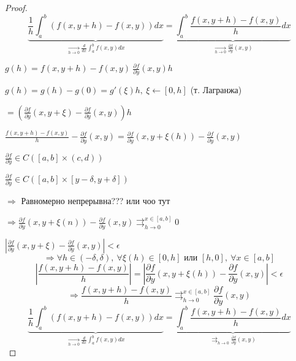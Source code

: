     \begin{proof}
        \[
            \underbrace{\frac{1}{h} \int_a^b (f(x, y+h) - f(x, y)) dx}_{\xrightarrow[h \rightarrow 0]{} \frac{d}{dx}\int_a^b f(x, y) dx} = \underbrace{\int_a^b \frac{f(x, y + h) - f(x, y)}{h} dx}_{\xrightarrow[h \rightarrow 0]{} \frac{\partial f}{\partial y}(x, y)}   
        \] %
        \par $g(h) = f(x, y+h) - f(x, y) \ \frac{\partial f}{\partial y}(x, y) h$
        \par $g(h) = g(h) - g(0) = g'(\xi) h, \ \xi \leftarrow [0, h]$ \quad (т. Лагранжа)
        \par $= (\frac{\partial f}{\partial y}(x, y + \xi) - \frac{\partial f}{\partial y}(x, y))h$
        \par $\frac{f(x, y+h) - f(x, y)}{h} - \frac{\partial f}{\partial y}(x, y) = \frac{\partial f}{\partial y}(x, y + \xi(h)) - \frac{\partial f}{\partial y}(x, y)$
        \par $\frac{\partial f}{\partial y} \in C([a, b] \times (c, d))$
        \par $\frac{\partial f}{\partial y} \in C([a, b] \times [y - \delta, y + \delta])$
        \par $\Rightarrow$ Равномерно непрерывна??? или чоо тут
        \par $\Rightarrow \frac{\partial f}{\partial y} (x, y + \xi(n)) - \frac{\partial f}{\partial y}(x, y) \rightrightarrows_{h \rightarrow 0}^{x \in [a, b] } 0$ %
        \par $|\frac{\partial f}{\partial y}(x, y + \xi) - \frac{\partial f}{\partial y}(x, y)| < \epsilon$
        \[
            \Rightarrow \forall h \in (-\delta, \delta), \ \forall \xi(h) \in [0, h] \text{ или } [h, 0], \ \forall x \in [a, b]    
        \]
        \[
            |\frac{f(x, y + h) - f(x, y)}{h}| = |\frac{\partial f}{\partial y}(x, y + \xi(h)) - \frac{\partial f}{\partial y}(x, y)| < \epsilon    
        \]
        \[
            \Rightarrow \frac{f(x, y+h) - f(x, y)}{h} \rightrightarrows_{h \rightarrow 0}^{x \in [a, b]} \frac{\partial f}{\partial y}(x, y)    
        \]
        \[
            \underbrace{\frac{1}{h} \int_a^b (f(x, y+h) - f(x, y)) dx}_{\xrightarrow[h \rightarrow 0]{} \frac{d}{dx}\int_a^b f(x, y) dx} = \underbrace{\int_a^b \frac{f(x, y + h) - f(x, y)}{h} dx}_{\rightrightarrows_{h \rightarrow 0}{} \frac{\partial f}{\partial y}(x, y)} %
        \] %
    \end{proof}

